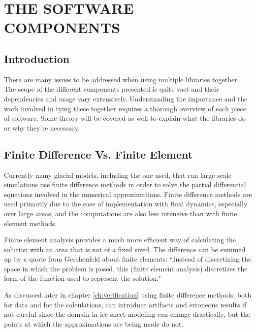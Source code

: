 
\chapter{THE SOFTWARE COMPONENTS}\label{ch:overview}

\section{Introduction}\label{sec:chp2intro}

There are many issues to be addressed when using multiple libraries together.  The scope of the different components presented is quite vast and their dependencies and usage vary extensively.  Understanding the importance and the work involved in tying these together requires a thorough overview of each piece of software.  Some theory will be covered as well to explain what the libraries do or why they're necessary.

\section{Finite Difference Vs. Finite Element}\label{sec:chp2grid}

Currently many glacial models, including the one used, that run large scale simulations use finite difference methods in order to solve the partial differential equations involved in the numerical approximations.  Finite difference methods are used primarily due to the ease of implementation with fluid dynamics, especially over large areas, and the computations are also less intensive than with finite element methods.

Finite element analysis provides a much more efficient way of calculating the solution with an area that is not of a fixed sized.  The difference can be summed up by a quote from Gershenfeld about finite elements: ``Instead of discretizing the space in which the problem is posed, this (finite element analysis) discretizes the form of the function used to represent the solution." \citep{Gershenfeld:1999}  

As discussed later in chapter \ref{ch:verification} using finite difference methods, both for data and for the calculations, can introduce artifacts and erroneous results if not careful since the domain in ice-sheet modeling can change drastically, but the points at which the approximations are being made do not.


